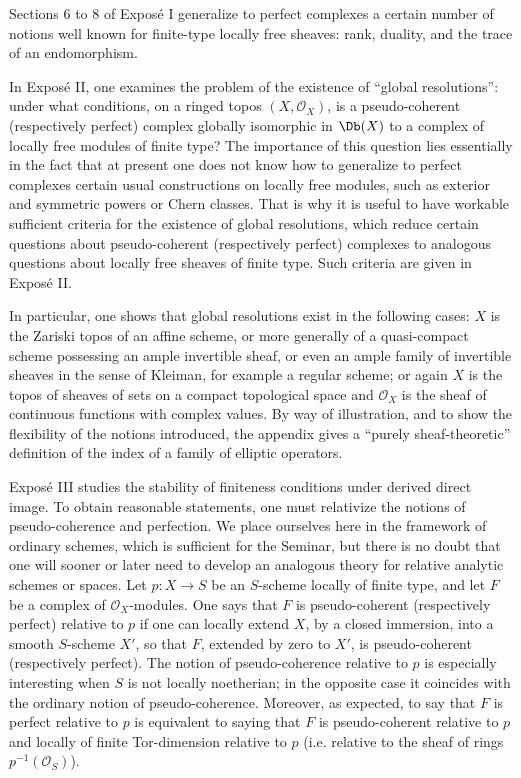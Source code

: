 \documentclass[11pt]{article}
\begin{document}
Sections 6 to 8 of Exposé I generalize to perfect complexes a certain number of notions well known for finite-type locally free sheaves: rank, duality, and the trace of an endomorphism.

In Exposé II, one examines the problem of the existence of ``global resolutions'': under what conditions, on a ringed topos \((X,\mathcal O_X)\), is a pseudo-coherent (respectively perfect) complex globally isomorphic in \(\Db(X)\) to a complex of locally free modules of finite type? The importance of this question lies essentially in the fact that at present one does not know how to generalize to perfect complexes certain usual constructions on locally free modules, such as exterior and symmetric powers or Chern classes. That is why it is useful to have workable sufficient criteria for the existence of global resolutions, which reduce certain questions about pseudo-coherent (respectively perfect) complexes to analogous questions about locally free sheaves of finite type. Such criteria are given in Exposé II.

In particular, one shows that global resolutions exist in the following cases: \(X\) is the Zariski topos of an affine scheme, or more generally of a quasi-compact scheme possessing an ample invertible sheaf, or even an ample family of invertible sheaves in the sense of Kleiman, for example a regular scheme; or again \(X\) is the topos of sheaves of sets on a compact topological space and \(\mathcal O_X\) is the sheaf of continuous functions with complex values. By way of illustration, and to show the flexibility of the notions introduced, the appendix gives a ``purely sheaf-theoretic'' definition of the index of a family of elliptic operators.

Exposé III studies the stability of finiteness conditions under derived direct image. To obtain reasonable statements, one must relativize the notions of pseudo-coherence and perfection. We place ourselves here in the framework of ordinary schemes, which is sufficient for the Seminar, but there is no doubt that one will sooner or later need to develop an analogous theory for relative analytic schemes or spaces. Let \(p:X\to S\) be an \(S\)-scheme locally of finite type, and let \(F\) be a complex of \(\mathcal O_X\)-modules. One says that \(F\) is pseudo-coherent (respectively perfect) relative to \(p\) if one can locally extend \(X\), by a closed immersion, into a smooth \(S\)-scheme \(X'\), so that \(F\), extended by zero to \(X'\), is pseudo-coherent (respectively perfect). The notion of pseudo-coherence relative to \(p\) is especially interesting when \(S\) is not locally noetherian; in the opposite case it coincides with the ordinary notion of pseudo-coherence. Moreover, as expected, to say that \(F\) is perfect relative to \(p\) is equivalent to saying that \(F\) is pseudo-coherent relative to \(p\) and locally of finite Tor-dimension relative to \(p\) (i.e. relative to the sheaf of rings \(p^{-1}(\mathcal O_S)\)).
\end{document}
